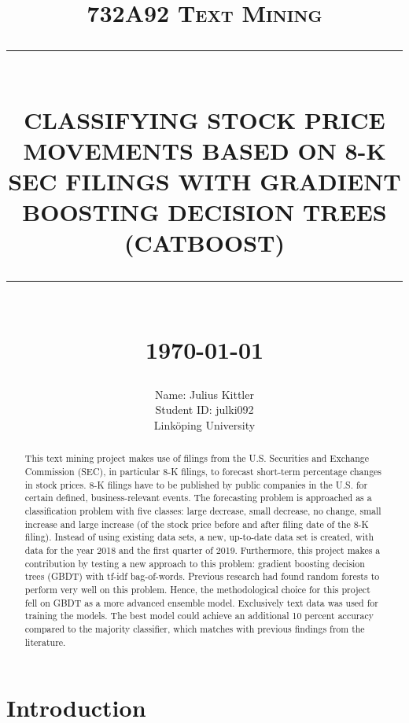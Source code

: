 \documentclass{article}
\newcommand{\HRule}[1]{\rule{\linewidth}{#1}}
\begin{document}
	
	\title{\textsc{732A92 Text Mining} \\ [2.0cm]
		\HRule{0.5pt} \\
		\LARGE \textbf{\uppercase{Classifying Stock Price Movements based on 8-K SEC filings with Gradient Boosting Decision Trees (CatBoost)}}
		\HRule{2pt} \\ [0.5cm]
		\normalsize \today \vspace*{5\baselineskip}}
	
	\date{}
	
	\author{
		Name: Julius Kittler \\ 
		Student ID: julki092 \\ 
		Link\"{o}ping University}
	
	\maketitle
	\newpage
	
	\begin{abstract}
		
	This text mining project makes use of filings from the U.S. Securities and Exchange Commission (SEC), in particular 8-K filings, to forecast short-term percentage changes in stock prices. 8-K filings have to be published by public companies in the U.S. for certain defined, business-relevant events. The forecasting problem is approached as a classification problem with five classes: large decrease, small decrease, no change, small increase and large increase (of the stock price before and after filing date of the 8-K filing). Instead of using existing data sets, a new, up-to-date data set is created, with data for the year 2018 and the first quarter of 2019. Furthermore, this project makes a contribution by testing a new approach to this problem: gradient boosting decision trees (GBDT) with tf-idf bag-of-words. Previous research had found random forests to perform very well on this problem. Hence, the methodological choice for this project fell on GBDT as a more advanced ensemble model. Exclusively text data was used for training the models. The best model could achieve an additional 10 percent accuracy compared to the majority classifier, which matches with previous findings from the literature.
	
	\end{abstract}

	\newpage
	\tableofcontents
	\newpage
	\listoffigures
	\listoftables
	\newpage

	\section{Introduction}
	
\end{document}
